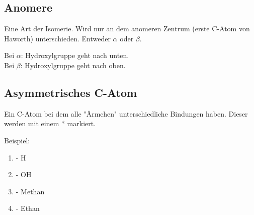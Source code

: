 \subsection{Anomere}
Eine Art der Isomerie. 
Wird nur an dem anomeren Zentrum (erste C-Atom von Haworth) unterschieden.
Entweder $\alpha$ oder $\beta$. 

Bei $\alpha$: Hydroxylgruppe geht nach unten.\\
Bei $\beta$: Hydroxylgruppe geht nach oben.

\subsection{Asymmetrisches C-Atom}
Ein C-Atom bei dem alle "Ärmchen" unterschiedliche Bindungen haben. Dieser werden mit einem * markiert.

Beispiel:
\begin{enumerate}
    \item - H
    \item - OH
    \item - Methan
    \item - Ethan
\end{enumerate}

